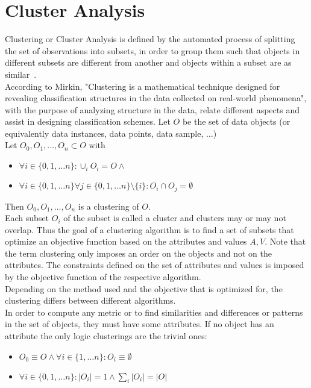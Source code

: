 \section{Cluster Analysis}\label{\positionnumber}
Clustering or Cluster Analysis is defined by the automated process of splitting the set of observations into subsets, in order to group them such that objects in different subsets are different from another and objects within a subset are as similar~\cite{han2011data}. \\
According to Mirkin, "Clustering is a mathematical technique designed for revealing classification structures in the data collected on real-world phenomena"\cite{mirkin2013mathematical}, with the purpose of analyzing structure in the data, relate different aspects and assist in designing classification schemes. 
Let $O$  be the set of data objects (or equivalently data instances, data points, data sample, $\dots$) \\
Let $O_0, O_1, \dots, O_n \subset O$ with
\begin{itemize}
    \item $\forall i \in \{0, 1, \dots n\}: \cup_i O_i = O \wedge$
    \item $\forall i \in \{0, 1, \dots n\} \forall j \in \{0, 1, \dots n\}\setminus\{i\}: O_i \cap O_j =\emptyset$
\end{itemize}
Then $O_0, O_1, \dots, O_n$ is a clustering of $O$. \\
Each subset $O_i$ of the subset is called a cluster and clusters may or may not overlap. Thus the goal of a clustering algorithm is to find a set of subsets that optimize an objective function based on the attributes and values $A, V$. Note that the term clustering only imposes an order on the objects and not on the attributes. The constraints defined on the set of attributes and values is imposed by the objective function of the respective algorithm. \\

Depending on the method used and the objective that is optimized for, the clustering differs between different algorithms. \\

In order to compute any metric or to find similarities and differences or patterns in the set of objects, they must have some attributes. If no object has an attribute the only logic clusterings are the trivial ones: 
\begin{itemize}
    \item $O_0 \equiv O \wedge \forall i \in \{1, \dots n\}: O_i \equiv \emptyset$
    \item $\forall i \in \{0, 1, \dots n\}: |O_i| = 1 \wedge \sum_i |O_i| = |O|$
\end{itemize}


